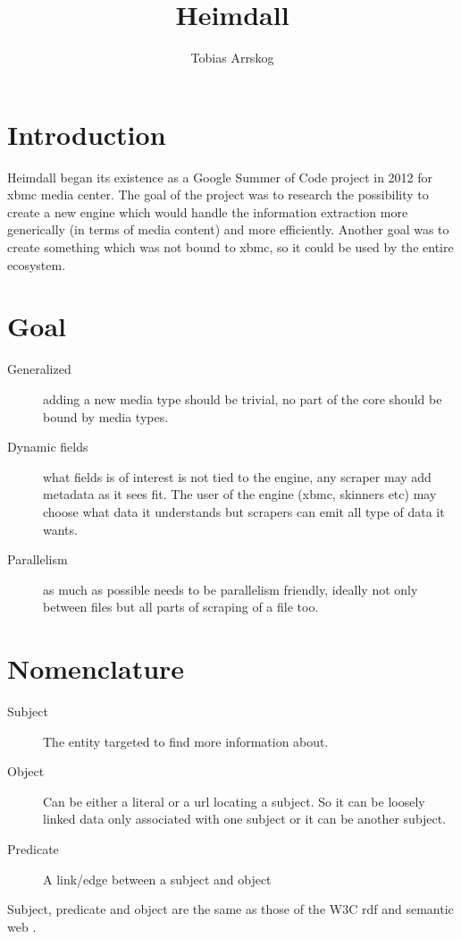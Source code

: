 \documentclass[10pt,a4paper]{article}
\author{Tobias Arrskog}
\title{Heimdall}
\begin{document}
\section{Introduction}
Heimdall began its existence as a Google Summer of Code project in 2012 for xbmc media center. The goal of the project was to research the possibility to create a new engine which would handle the information extraction more generically (in terms of media content) and more efficiently. Another goal was to create something which was not bound to xbmc, so it could be used by the entire ecosystem.

\section{Goal}

\begin{description}
	\item[Generalized] adding a new media type should be trivial, no part of the core should be bound by media types.
	\item[Dynamic fields] what fields is of interest is not tied to the engine, any scraper may add metadata as it sees fit. The user of the engine (xbmc, skinners etc) may choose what data it understands but scrapers can emit all type of data it wants.
	\item[Parallelism] as much as possible needs to be parallelism friendly, ideally not only between files but all parts of scraping of a file too.
\end{description}

\section{Nomenclature}

\begin{description}
	\item[Subject] The entity targeted to find more information about.
	\item[Object] Can be either a literal or a url locating a subject. So it can be loosely linked data only associated with one subject or it can be another subject.
	\item[Predicate] A link/edge between a subject and object
\end{description}

Subject, predicate and object are the same as those of the W3C rdf \cite{w3c-rdf} and semantic web \cite{wiki-semantic-web} \cite{w3c-semantic-web}.
\end{document}
